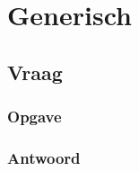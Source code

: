 \documentclass[indexstructuren.tex]{subfiles}
\begin{document}
\chapter{Generisch}
\renewcommand\thesection{V\arabic{section}}
\renewcommand\thesubsection{V\arabic{section}}

\section{Vraag}
\subsection*{Opgave}

\subsection*{Antwoord}
\end{document}
